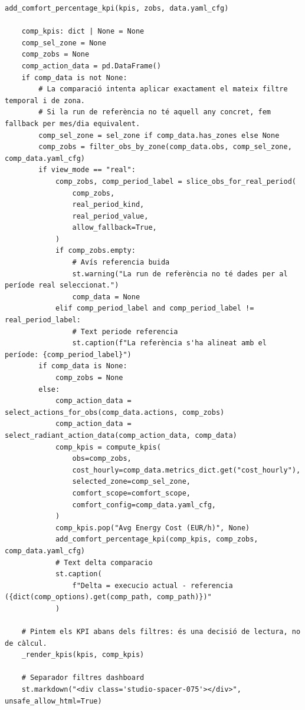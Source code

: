 \documentclass[10pt,a4paper]{article}
\begin{document}
\begin{lstlisting}[style=studioPython,caption={page\_components/resultats\_dashboard.py},label={lst:page-components-resultats-dashboard-py}]
    add_comfort_percentage_kpi(kpis, zobs, data.yaml_cfg)

    comp_kpis: dict | None = None
    comp_sel_zone = None
    comp_zobs = None
    comp_action_data = pd.DataFrame()
    if comp_data is not None:
        # La comparació intenta aplicar exactament el mateix filtre temporal i de zona.
        # Si la run de referència no té aquell any concret, fem fallback per mes/dia equivalent.
        comp_sel_zone = sel_zone if comp_data.has_zones else None
        comp_zobs = filter_obs_by_zone(comp_data.obs, comp_sel_zone, comp_data.yaml_cfg)
        if view_mode == "real":
            comp_zobs, comp_period_label = slice_obs_for_real_period(
                comp_zobs,
                real_period_kind,
                real_period_value,
                allow_fallback=True,
            )
            if comp_zobs.empty:
                # Avís referencia buida
                st.warning("La run de referència no té dades per al període real seleccionat.")
                comp_data = None
            elif comp_period_label and comp_period_label != real_period_label:
                # Text periode referencia
                st.caption(f"La referència s'ha alineat amb el període: {comp_period_label}")
        if comp_data is None:
            comp_zobs = None
        else:
            comp_action_data = select_actions_for_obs(comp_data.actions, comp_zobs)
            comp_action_data = select_radiant_action_data(comp_action_data, comp_data)
            comp_kpis = compute_kpis(
                obs=comp_zobs,
                cost_hourly=comp_data.metrics_dict.get("cost_hourly"),
                selected_zone=comp_sel_zone,
                comfort_scope=comfort_scope,
                comfort_config=comp_data.yaml_cfg,
            )
            comp_kpis.pop("Avg Energy Cost (EUR/h)", None)
            add_comfort_percentage_kpi(comp_kpis, comp_zobs, comp_data.yaml_cfg)
            # Text delta comparacio
            st.caption(
                f"Delta = execucio actual - referencia ({dict(comp_options).get(comp_path, comp_path)})"
            )

    # Pintem els KPI abans dels filtres: és una decisió de lectura, no de càlcul.
    _render_kpis(kpis, comp_kpis)

    # Separador filtres dashboard
    st.markdown("<div class='studio-spacer-075'></div>", unsafe_allow_html=True)


\end{lstlisting}
\end{document}
